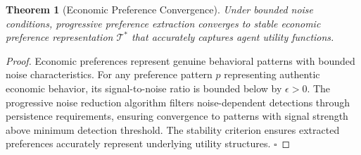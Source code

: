 \documentclass[12pt,a4paper]{article}
\newtheorem{theorem}{Theorem}
\begin{document}
\begin{theorem}[Economic Preference Convergence]
Under bounded noise conditions, progressive preference extraction converges to stable economic preference representation $\mathcal{T}^*$ that accurately captures agent utility functions.
\end{theorem}

\begin{proof}
Economic preferences represent genuine behavioral patterns with bounded noise characteristics. For any preference pattern $p$ representing authentic economic behavior, its signal-to-noise ratio is bounded below by $\epsilon > 0$. The progressive noise reduction algorithm filters noise-dependent detections through persistence requirements, ensuring convergence to patterns with signal strength above minimum detection threshold. The stability criterion ensures extracted preferences accurately represent underlying utility structures. $\square$
\end{proof}
\end{document}
